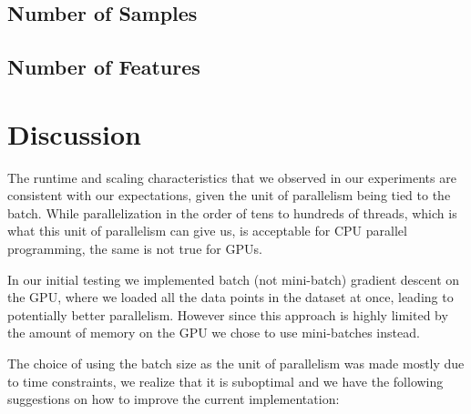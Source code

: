 \documentclass[11pt,a4paper]{article}
\begin{document}
\subsection{Number of Samples}


\subsection{Number of Features}


\section{Discussion}

The runtime and scaling characteristics that we observed in our experiments are
consistent with our expectations, given the unit of parallelism being tied to the
batch. While parallelization in the order of tens to hundreds of threads, which
is what this unit of parallelism can give us, is acceptable for CPU parallel
programming, the same is not true for GPUs.

In our initial testing we implemented batch (not mini-batch) gradient descent
on the GPU, where we loaded all the data points in the dataset at once, leading
to potentially better parallelism. However since this approach is highly limited
by the amount of memory on the GPU we chose to use mini-batches instead.

The choice of using the batch size as the unit of parallelism was made mostly due to
time constraints, we realize that it is suboptimal and we have the following suggestions
on how to improve the current implementation:
\end{document}
